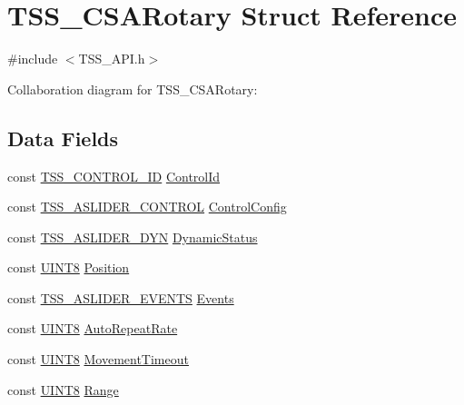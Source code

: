\hypertarget{struct_t_s_s___c_s_a_rotary}{}\section{T\+S\+S\+\_\+\+C\+S\+A\+Rotary Struct Reference}
\label{struct_t_s_s___c_s_a_rotary}


{\ttfamily \#include $<$T\+S\+S\+\_\+\+A\+P\+I.\+h$>$}



Collaboration diagram for T\+S\+S\+\_\+\+C\+S\+A\+Rotary\+:
\subsection*{Data Fields}
\begin{DoxyCompactItemize}
\item 
const \hyperlink{struct_t_s_s___c_o_n_t_r_o_l___i_d}{T\+S\+S\+\_\+\+C\+O\+N\+T\+R\+O\+L\+\_\+\+ID} \hyperlink{struct_t_s_s___c_s_a_rotary_afcbd53ab3bcf97cfd8d0a8b45863e11a}{Control\+Id}
\item 
const \hyperlink{struct_t_s_s___a_s_l_i_d_e_r___c_o_n_t_r_o_l}{T\+S\+S\+\_\+\+A\+S\+L\+I\+D\+E\+R\+\_\+\+C\+O\+N\+T\+R\+OL} \hyperlink{struct_t_s_s___c_s_a_rotary_a5b94b5e450afad633a54cc029089f070}{Control\+Config}
\item 
const \hyperlink{struct_t_s_s___a_s_l_i_d_e_r___d_y_n}{T\+S\+S\+\_\+\+A\+S\+L\+I\+D\+E\+R\+\_\+\+D\+YN} \hyperlink{struct_t_s_s___c_s_a_rotary_a84789a0c69de76718237d5a351fc354c}{Dynamic\+Status}
\item 
const \hyperlink{_t_s_s___data_types_8h_ab27e9918b538ce9d8ca692479b375b6a}{U\+I\+N\+T8} \hyperlink{struct_t_s_s___c_s_a_rotary_aa2a6e9823c32640f1d5a01f97ffc0cae}{Position}
\item 
const \hyperlink{struct_t_s_s___a_s_l_i_d_e_r___e_v_e_n_t_s}{T\+S\+S\+\_\+\+A\+S\+L\+I\+D\+E\+R\+\_\+\+E\+V\+E\+N\+TS} \hyperlink{struct_t_s_s___c_s_a_rotary_aa6978492052696699727c15985c4e547}{Events}
\item 
const \hyperlink{_t_s_s___data_types_8h_ab27e9918b538ce9d8ca692479b375b6a}{U\+I\+N\+T8} \hyperlink{struct_t_s_s___c_s_a_rotary_aef1117c410a59acb56f45d9674e0dd56}{Auto\+Repeat\+Rate}
\item 
const \hyperlink{_t_s_s___data_types_8h_ab27e9918b538ce9d8ca692479b375b6a}{U\+I\+N\+T8} \hyperlink{struct_t_s_s___c_s_a_rotary_ad3e98b5d97454837cd6293b7abffbe9f}{Movement\+Timeout}
\item 
const \hyperlink{_t_s_s___data_types_8h_ab27e9918b538ce9d8ca692479b375b6a}{U\+I\+N\+T8} \hyperlink{struct_t_s_s___c_s_a_rotary_ac3bbfb6603540e32d0c07254344b524c}{Range}
\end{DoxyCompactItemize}


